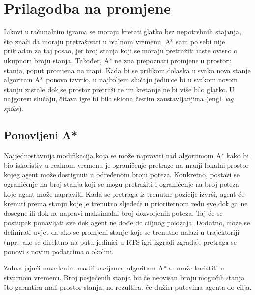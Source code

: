 \documentclass[times, utf8, zavrsni, numeric]{fer}
\begin{document}
\section{Prilagodba na promjene}\label{sec:adaptation}

\par Likovi u računalnim igrama se moraju kretati glatko bez nepotrebnih stajanja, što znači da moraju pretraživati u realnom vremenu. 
A* sam po sebi nije prikladan za taj posao, jer broj stanja koji se moraju pretražiti raste ovisno o ukupnom broju stanja. 
Također, A* ne zna prepoznati promjene u prostoru stanja, poput promjena na mapi. Kada bi se prilikom dolaska u svako novo stanje algoritam A* ponovo izvrtio, u najboljem slučaju jedinice bi u svakom novom stanju zastale dok se prostor pretraži te im kretanje ne bi više bilo glatko. 
U najgorem slučaju, čitava igre bi bila sklona čestim zaustavljanjima (engl. \textit{lag spike}).

\subsection{Ponovljeni A*}

\par Najjednostavnija modifikacija koja se može napraviti nad algoritmom A* kako bi bio iskoristiv u realnom vremenu je ograničenje pretrage na manji lokalni prostor kojeg agent može dostignuti u određenom broju poteza. 
Konkretno, postavi se ograničenje na broj stanja koji se mogu pretražiti i ograničenje na broj poteza koje agent može napraviti.
Kada se pretraga iz trenutne pozicije izvrši, agent će krenuti prema stanju koje je trenutno sljedeće u prioritetnom redu sve dok ga ne dosegne ili dok ne napravi maksimalni broj dozvoljenih poteza.
Taj će se postupak ponavljati sve dok agent ne dođe do ciljnog položaja.
Dodatno, može se definirati uvjet da ako se promjeni stanje koje se trenutno nalazi u trajektoriji (npr.\ ako se direktno na putu jedinici u RTS igri izgradi zgrada), pretraga se ponovi s novim podatcima o okolini.

\par Zahvaljujući navedenim modifikacijama, algoritam A* se može koristiti u stvarnom vremenu. 
Broj posjećenih stanja bit će neovisan broju mogućih stanja što garantira mali prostor stanja, no rezultirat će dužim putevima agenta do cilja.
\end{document}

